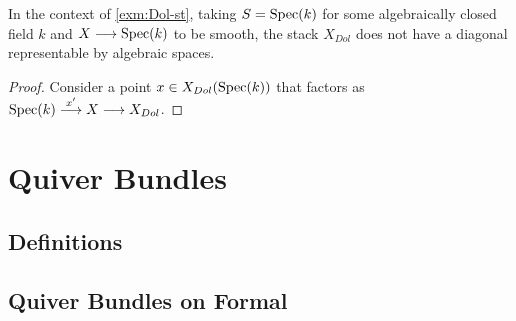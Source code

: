 \documentclass[11pt]{amsart}
\begin{document}
\begin{prop}\label{prop:Dol-st-diag-non-rep}
In the context of \cref{exm:Dol-st}, taking $S = \mathrm{Spec}(k)$ for some
algebraically closed field $k$ and $X \to \Spec(k)$ to be smooth,
the stack $X_{Dol}$ does not have a diagonal representable by algebraic spaces.
\end{prop}
\begin{proof}
Consider a point $x \in X_{Dol}(\mathrm{Spec}(k))$ that factors as
$\Spec(k) \to[x'] X \to X_{Dol}$.
\end{proof}

\section{Quiver Bundles}

\subsection{Definitions}

\subsection{Quiver Bundles on Formal}

\printbibliography
\end{document}
